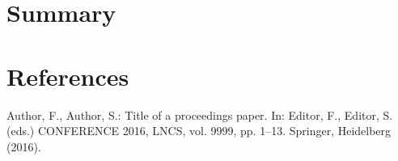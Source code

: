 \documentclass{llncs}
\begin{document}
\section{Summary}

\section{References}






\begin{thebibliography}{1}

Author, F., Author, S.: Title of a proceedings paper. In: Editor,
F., Editor, S. (eds.) CONFERENCE 2016, LNCS, vol. 9999, pp. 1--13.
Springer, Heidelberg (2016). 

\end{thebibliography}
\end{document}
